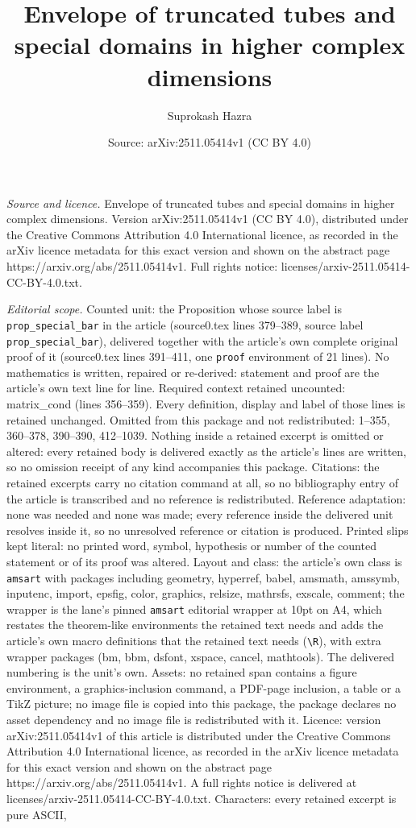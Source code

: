 \documentclass[10pt,a4paper]{amsart}
\title[Envelope of truncated tubes and special domains in higher co]{Envelope of truncated tubes and special domains in higher complex dimensions}
\author{Suprokash Hazra}
\date{Source: arXiv:2511.05414v1 (CC BY 4.0)}
\begin{document}
\maketitle

\noindent\emph{Source and licence.} Envelope of truncated tubes and special domains in higher complex dimensions. Version arXiv:2511.05414v1 (CC BY 4.0), distributed under the Creative Commons Attribution 4.0 International licence, as recorded in the arXiv licence metadata for this exact version and shown on the abstract page https://arxiv.org/abs/2511.05414v1. Full rights notice: licenses/arxiv-2511.05414-CC-BY-4.0.txt.\par\smallskip

\noindent\textit{Editorial scope.} Counted unit: the Proposition whose source label is \texttt{prop\_special\_bar} in the article (source0.tex lines 379--389, source label \texttt{prop\_special\_bar}), delivered together with the article's own complete original proof of it (source0.tex lines 391--411, one \texttt{proof} environment of 21 lines). No mathematics is written, repaired or re-derived: statement and proof are the article's own text line for line. Required context retained uncounted: matrix\_cond (lines 356--359). Every definition, display and label of those lines is retained unchanged. Omitted from this package and not redistributed: 1--355, 360--378, 390--390, 412--1039. Nothing inside a retained excerpt is omitted or altered: every retained body is delivered exactly as the article's lines are written, so no omission receipt of any kind accompanies this package. Citations: the retained excerpts carry no citation command at all, so no bibliography entry of the article is transcribed and no reference is redistributed. Reference adaptation: none was needed and none was made; every reference inside the delivered unit resolves inside it, so no unresolved reference or citation is produced. Printed slips kept literal: no printed word, symbol, hypothesis or number of the counted statement or of its proof was altered. Layout and class: the article's own class is \texttt{amsart} with packages including geometry, hyperref, babel, amsmath, amssymb, inputenc, import, epsfig, color, graphics, relsize, mathrsfs, exscale, comment; the wrapper is the lane's pinned \texttt{amsart} editorial wrapper at 10pt on A4, which restates the theorem-like environments the retained text needs and adds the article's own macro definitions that the retained text needs (\texttt{\textbackslash R}), with extra wrapper packages (bm, bbm, dsfont, xspace, cancel, mathtools). The delivered numbering is the unit's own. Assets: no retained span contains a figure environment, a graphics-inclusion command, a PDF-page inclusion, a table or a TikZ picture; no image file is copied into this package, the package declares no asset dependency and no image file is redistributed with it. Licence: version arXiv:2511.05414v1 of this article is distributed under the Creative Commons Attribution 4.0 International licence, as recorded in the arXiv licence metadata for this exact version and shown on the abstract page https://arxiv.org/abs/2511.05414v1. A full rights notice is delivered at licenses/arxiv-2511.05414-CC-BY-4.0.txt. Characters: every retained excerpt is pure ASCII, 
\end{document}

